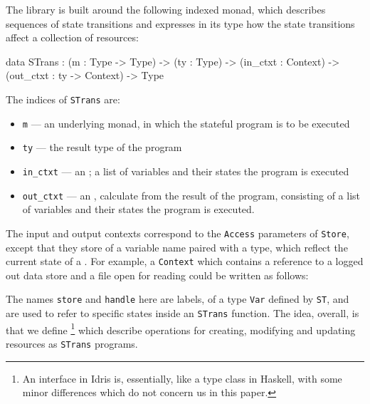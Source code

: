 The \states{} library is built around the following indexed monad, which
describes sequences of state transitions and expresses in its type
how the state transitions affect a collection of resources:

\small
\begin{code}
data STrans : (m : Type -> Type) -> (ty : Type) ->
              (in_ctxt : Context) -> (out_ctxt : ty -> Context) -> Type
\end{code}
\normalsize

The indices of \texttt{STrans} are:

\begin{itemize}
\item \texttt{m} --- an underlying monad, in which the stateful program
is to be executed
\item \texttt{ty} --- the result type of the program
\item \texttt{in\_ctxt} --- an ; a list
of variables and their states  the program is executed
\item \texttt{out\_ctxt} --- an , calculate from the
result of the program, consisting of a list of variables and their states
 the program is executed.
\end{itemize}

The input and output contexts correspond to the
\texttt{Access} parameters of \texttt{Store}, except that they store
 of a variable name paired with a type, which
reflect the current state of a .
For example, a \texttt{Context} which contains a reference to a logged out
data store and a file open for reading could be written as follows:

\small
\begin{code}
\end{code}
\normalsize

The names \texttt{store} and \texttt{handle} here are labels, of a type
\texttt{Var} defined by \texttt{ST}, and are used to refer to specific states
inside an \texttt{STrans} function. The idea, overall, is that we define
\footnote{An interface in Idris is, essentially, like a type
class in Haskell, with some minor differences which do not concern us in this
paper.} which describe operations for creating, modifying and updating
resources as \texttt{STrans} programs. 

